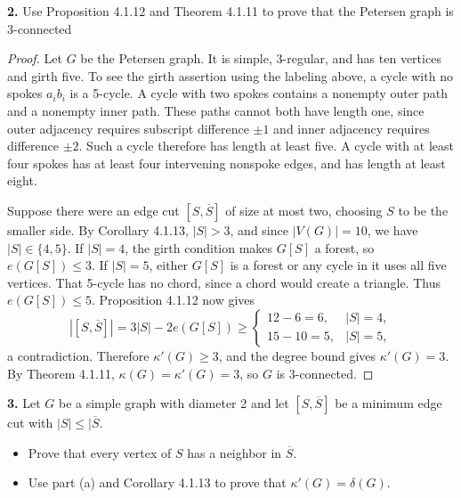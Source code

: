 \documentclass[12pt]{amsart}
\theoremstyle{conjecture}
\theoremstyle{definition}
\theoremstyle{question}
\theoremstyle{theorem}
\begin{document}
    \noindent\textbf{2.} Use Proposition 4.1.12 and Theorem 4.1.11 to prove that the Petersen graph is
    3-connected

    \begin{proof}

        Let $G$ be the Petersen graph. It is simple, 3-regular, and has
        ten vertices and girth five. To see the girth assertion using the
        labeling above, a cycle with no spokes $a_i b_i$ is a 5-cycle.
        A cycle with two spokes contains a nonempty outer path and a
        nonempty inner path. These paths cannot both have length one,
        since outer adjacency requires subscript difference $\pm1$ and
        inner adjacency requires difference $\pm2$. Such a cycle therefore
        has length at least five. A cycle with at least four spokes has
        at least four intervening nonspoke edges, and has length at least eight.

        Suppose there were an edge cut $[S,\overline S]$ of size at most
        two, choosing $S$ to be the smaller side. By Corollary 4.1.13,
        $|S|>3$, and since $|V(G)|=10$, we have $|S|\in\{4,5\}$.
        If $|S|=4$, the girth condition makes $G[S]$ a forest, so
        $e(G[S])\le3$. If $|S|=5$, either $G[S]$ is a forest or any
        cycle in it uses all five vertices. That 5-cycle has no chord,
        since a chord would create a triangle. Thus $e(G[S])\le5$.
        Proposition 4.1.12 now gives
        \[
        |[S,\overline S]|=3|S|-2e(G[S])\ge
        \begin{cases}
        12-6=6,&|S|=4,\\
        15-10=5,&|S|=5,
        \end{cases}
        \]
        a contradiction. Therefore $\kappa'(G)\ge3$, and the degree
        bound gives $\kappa'(G)=3$. By Theorem 4.1.11,
        $\kappa(G)=\kappa'(G)=3$, so $G$ is 3-connected.
    \end{proof}

    \noindent\textbf{3.} Let $G$ be a simple graph with diameter 2 and let $[S, \overline{S}]$ be a
    minimum edge cut with $|S|\le |\overline{S}$.
    \begin{itemize}
        \item[(a)] Prove that every vertex of $S$ has a neighbor in $\overline{S}$.
        \item[(b)] Use part (a) and Corollary 4.1.13 to prove that $\kappa'(G) = \delta(G)$.
    \end{itemize}
\end{document}
